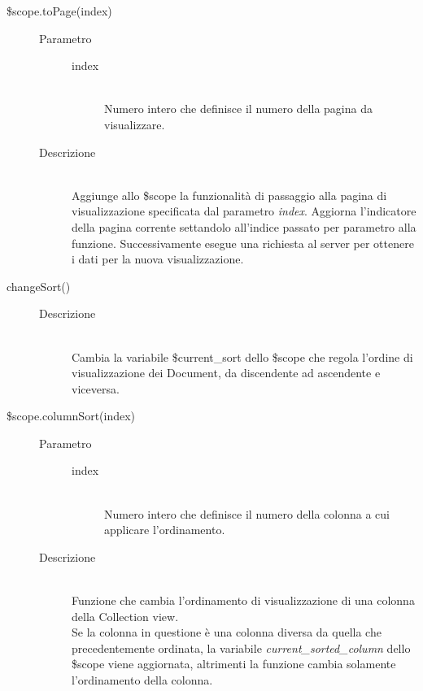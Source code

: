 \begin{description}
\begin{description}
  \item[\$scope.toPage(index)] \hfill
  \begin{description}
  	\item[Parametro] \hfill
  	\begin{description}
  		\item[index] \hfill \\
  		Numero intero che definisce il numero della pagina da visualizzare.
  	\end{description}
  	\item[Descrizione] \hfill \\
  Aggiunge allo \$scope la funzionalità di passaggio alla pagina di visualizzazione specificata dal parametro \textit{index}. Aggiorna l'indicatore della pagina corrente settandolo all'indice passato per parametro alla funzione. Successivamente esegue una richiesta al server per ottenere i dati per la nuova visualizzazione.
  \end{description}
  
  \item[changeSort()] \hfill 
  \begin{description}
  	\item[Descrizione] \hfill \\
  Cambia la variabile \$current\_sort dello \$scope che regola l'ordine di visualizzazione dei Document, da discendente ad ascendente e viceversa.
  \end{description}
  
  \item[\$scope.columnSort(index)] \hfill
  \begin{description}
  	\item[Parametro] \hfill
  	\begin{description}
  		\item[index] \hfill \\
  		Numero intero che definisce il numero della colonna a cui applicare l'ordinamento.
  	\end{description}
  	\item[Descrizione] \hfill \\
  Funzione che cambia l'ordinamento di visualizzazione di una colonna della Collection view. \\
  Se la colonna in questione è una colonna diversa da quella che precedentemente ordinata, la variabile \textit{current\_sorted\_column} dello \$scope viene aggiornata, altrimenti la funzione cambia solamente l'ordinamento della colonna.
  \end{description}
  

\end{description}
\end{description}

